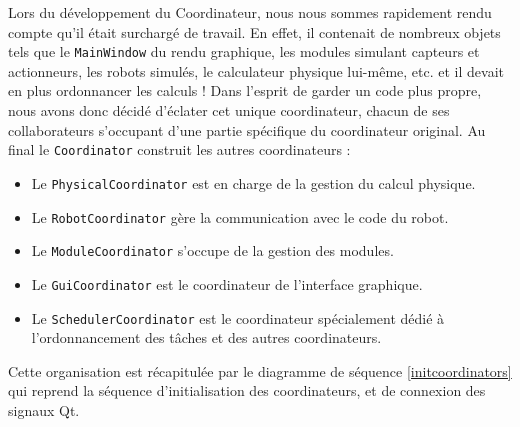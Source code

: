Lors du développement du Coordinateur, nous nous sommes rapidement rendu compte qu'il était surchargé de travail. En effet, il contenait de nombreux objets tels que le \texttt{MainWindow} du rendu graphique, les modules simulant capteurs et actionneurs, les robots simulés, le calculateur physique lui-même, etc. et il devait en plus ordonnancer les calculs !
Dans l'esprit de garder un code plus propre, nous avons donc décidé d'éclater cet unique coordinateur, chacun de ses collaborateurs s'occupant d'une partie spécifique du coordinateur original. Au final le \texttt{Coordinator} construit les autres coordinateurs :
\begin{itemize}
    \item Le \texttt{PhysicalCoordinator} est en charge de la gestion du calcul physique.
    \item Le \texttt{RobotCoordinator} gère la communication avec le code du robot.
    \item Le \texttt{ModuleCoordinator} s'occupe de la gestion des modules.
    \item Le \texttt{GuiCoordinator} est le coordinateur de l'interface graphique. 
    \item Le \texttt{SchedulerCoordinator} est le coordinateur spécialement dédié à l'ordonnancement des tâches et des autres coordinateurs.
\end{itemize}
Cette organisation est récapitulée par le diagramme de séquence \ref{initcoordinators} qui reprend la séquence d'initialisation des coordinateurs, et de connexion des signaux Qt. 

\paragraph{} %

